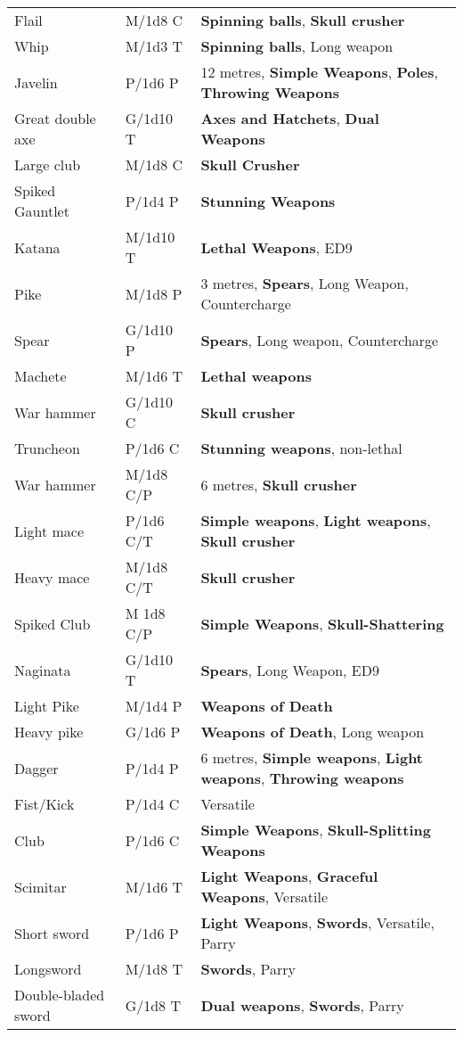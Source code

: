 \documentclass[landscape,10pt,a4paper]{article}
\begin{document}
\begin{multicols}{2}
\begin{dmbox}[title=Weapons - page \pageref{equipmentweapons}]
{\begin{tabularx}{1\linewidth}{lll}
Flail& M/1d8 C& \textbf{Spinning balls}, \textbf{Skull crusher}\\
Whip& M/1d3 T& \textbf{Spinning balls}, Long weapon\\
Javelin& P/1d6 P& 12 metres, \textbf{Simple Weapons}, \textbf{Poles}, \textbf{Throwing Weapons}\\
Great double axe& G/1d10 T& \textbf{Axes and Hatchets}, \textbf{Dual Weapons}\\
Large club& M/1d8 C&\textbf{Skull Crusher}\\
Spiked Gauntlet& P/1d4 P&\textbf{Stunning Weapons}\\
Katana& M/1d10 T& \textbf{Lethal Weapons}, ED9\\
Pike& M/1d8 P&3 metres, \textbf{Spears}, Long Weapon, Countercharge\\
Spear& G/1d10 P&\textbf{Spears}, Long weapon, Countercharge\\
Machete& M/1d6 T&\textbf{Lethal weapons}\\
War hammer& G/1d10 C& \textbf{Skull crusher}\\
Truncheon& P/1d6 C& \textbf{Stunning weapons}, non-lethal\\
War hammer& M/1d8 C/P& 6 metres, \textbf{Skull crusher}\\
Light mace& P/1d6 C/T& \textbf{Simple weapons}, \textbf{Light weapons}, \textbf{Skull crusher} \\
Heavy mace& M/1d8 C/T& \textbf{Skull crusher}\\
Spiked Club& M 1d8 C/P& \textbf{Simple Weapons}, \textbf{Skull-Shattering}\\
Naginata& G/1d10 T&\textbf{Spears}, Long Weapon, ED9\\
Light Pike& M/1d4 P&\textbf{Weapons of Death}\\
Heavy pike& G/1d6 P&\textbf{Weapons of Death}, Long weapon\\
Dagger& P/1d4 P& 6 metres, \textbf{Simple weapons}, \textbf{Light weapons}, \textbf{Throwing weapons}\\
Fist/Kick & P/1d4 C&Versatile\\
Club& P/1d6 C& \textbf{Simple Weapons}, \textbf{Skull-Splitting Weapons}\\
Scimitar& M/1d6 T&\textbf{Light Weapons}, \textbf{Graceful Weapons}, Versatile\\
Short sword& P/1d6 P&\textbf{Light Weapons}, \textbf{Swords}, Versatile, Parry\\
Longsword& M/1d8 T&\textbf{Swords}, Parry\\
Double-bladed sword& G/1d8 T& \textbf{Dual weapons}, \textbf{Swords}, Parry\\

\end{tabularx}}
\end{dmbox}
\end{multicols}
\end{document}

